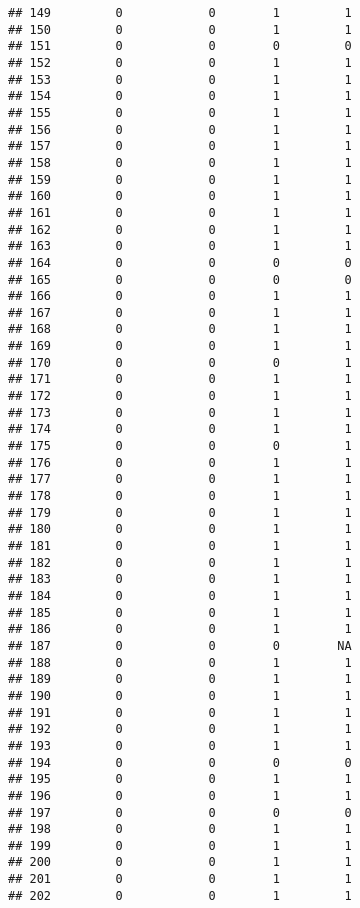 \documentclass[
]{article}
\begin{document}
\begin{verbatim}
## 149         0            0        1         1
## 150         0            0        1         1
## 151         0            0        0         0
## 152         0            0        1         1
## 153         0            0        1         1
## 154         0            0        1         1
## 155         0            0        1         1
## 156         0            0        1         1
## 157         0            0        1         1
## 158         0            0        1         1
## 159         0            0        1         1
## 160         0            0        1         1
## 161         0            0        1         1
## 162         0            0        1         1
## 163         0            0        1         1
## 164         0            0        0         0
## 165         0            0        0         0
## 166         0            0        1         1
## 167         0            0        1         1
## 168         0            0        1         1
## 169         0            0        1         1
## 170         0            0        0         1
## 171         0            0        1         1
## 172         0            0        1         1
## 173         0            0        1         1
## 174         0            0        1         1
## 175         0            0        0         1
## 176         0            0        1         1
## 177         0            0        1         1
## 178         0            0        1         1
## 179         0            0        1         1
## 180         0            0        1         1
## 181         0            0        1         1
## 182         0            0        1         1
## 183         0            0        1         1
## 184         0            0        1         1
## 185         0            0        1         1
## 186         0            0        1         1
## 187         0            0        0        NA
## 188         0            0        1         1
## 189         0            0        1         1
## 190         0            0        1         1
## 191         0            0        1         1
## 192         0            0        1         1
## 193         0            0        1         1
## 194         0            0        0         0
## 195         0            0        1         1
## 196         0            0        1         1
## 197         0            0        0         0
## 198         0            0        1         1
## 199         0            0        1         1
## 200         0            0        1         1
## 201         0            0        1         1
## 202         0            0        1         1

\end{verbatim}
\end{document}
